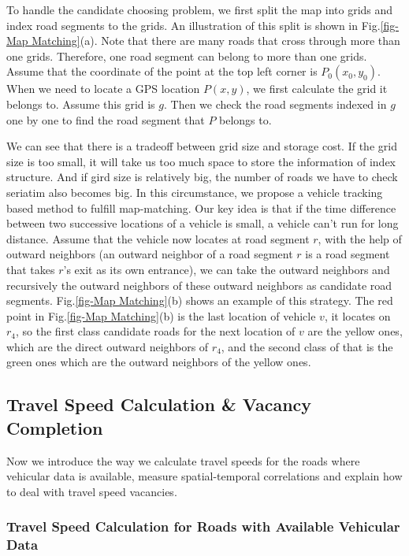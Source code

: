 \documentclass[twocolumn,10pt,final,conference]{IEEEtran}
\begin{document}
To handle the candidate choosing  problem, we first split the map into grids and index road segments to the grids.
An illustration of this split is shown in Fig.\ref{fig-Map Matching}(a).
Note that there are many roads that cross through more than one grids. Therefore, one road segment can belong to more than one grids.
Assume that the coordinate of the point at the top left corner is $P_0(x_0,y_0)$. When we need to locate a GPS location $P(x,y)$, we first calculate the grid it belongs to. Assume this grid is $g$. Then we check the road segments indexed in $g$ one by one to find the road segment that $P$ belongs to.



We can see that there is a tradeoff between grid size and storage cost. If the grid size is too small, it will take us too much space to store the information of index structure. And if gird size is relatively big, the number of roads we have to check seriatim also becomes big. In this circumstance, we propose a vehicle tracking based method to fulfill map-matching. Our key idea is that if the time difference between two successive locations of a vehicle is small, a vehicle can't run for long distance. Assume that the vehicle now locates at road segment $r$, with the help of outward neighbors (an outward neighbor of a road segment $r$ is a road segment that takes $r$'s exit as its own entrance), we can take the outward neighbors and recursively the outward neighbors of these outward neighbors as candidate road segments. Fig.\ref{fig-Map Matching}(b) shows an example of this strategy. The red point in Fig.\ref{fig-Map Matching}(b) is the last location of vehicle $v$, it locates on $r_4$, so the first class candidate roads for the next location of $v$ are the yellow ones, which are the direct outward neighbors of $r_4$, and the second class of that is the green ones which are the outward neighbors of the yellow ones.

\subsection{Travel Speed Calculation \& Vacancy Completion}\label{section-Travel Speed Whole}
Now we introduce the way we calculate travel speeds for the roads where vehicular data is available, measure spatial-temporal correlations and explain how to deal with travel speed vacancies.

\subsubsection{Travel Speed Calculation for Roads with Available Vehicular Data}\label{section-Current TS when data available}
\quad
\end{document}
